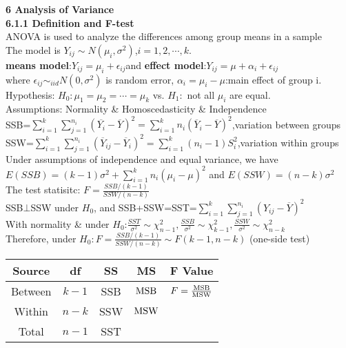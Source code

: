 \documentclass[10pt,a4paper,landscape]{article}
\begin{document}
\begin{multicols}{3}
{	
	
	
	
  {\small\textbf{6 Analysis of Variance}}\\
  \textbf{6.1.1 Definition and F-test}\\
  ANOVA is used to analyze the differences among group means in a sample\\
  The model is $Y_{ij}\sim N(\mu_i,\sigma^2 )$,$i=1,2,\cdots,k$.\\
  \textbf{means model}:$Y_{ij}=\mu_i+\epsilon_{ij}$and \textbf{effect model}:$Y_{ij}=\mu+\alpha_i+\epsilon_{ij}$ \\
  where $\epsilon_{ij}\sim_{iid}N(0,\sigma^2) $ is random error, $\alpha_i=\mu_i-\mu$:main effect of group i.
  Hypothesis: $H_0:\mu_1=\mu_2=\cdots = \mu_k$ vs. $H_1:$ not all $\mu_i$ are equal.\\
  Assumptions: Normality \& Homoscedasticity \& Independence \\
  SSB=$\sum_{i=1}^{k}\sum_{j=1}^{n_i}(\overline{Y_i}-\overline{Y} )^2=\sum_{i=1}^kn_i(\overline{Y}_i-\overline{Y} )^2 $,variation between groups \\
  SSW=$\sum_{i=1}^{k}\sum_{j=1}^{n_i}(\overline{Y}_{ij}-\overline{Y}_i )^2=\sum_{i=1}^k(n_i-1)S_i^2 $,variation within groups\\
  Under assumptions of independence and equal variance, we have $E(SSB)=(k-1)\sigma^2+\sum_{i=1}^k n_i(\mu_i-\mu)^2 $ and $E(SSW)=(n-k)\sigma^2$\\
  The test statisitc: $F=\frac{SSB/(k-1)}{SSW/(n-k)}$\\
  SSB$\bot$SSW under $H_0$, and SSB+SSW=SST=$\sum_{i=1}^k\sum_{j=1}^{n_i}(Y_{ij}-\overline{Y}) ^2$\\
  With normality \& under $H_0$:$\frac{SST}{\sigma^2}\sim \chi^2_{n-1} ,\frac{SSB}{\sigma^2}\sim \chi^2_{k-1} ,\frac{SSW}{\sigma^2}\sim \chi^2_{n-k} $\\
  Therefore, under $H_0:F=\frac{SSB/(k-1)}{SSW/(n-k)}\sim F(k-1,n-k)$ (one-side test)
  \begin{table}[H]
  	\scriptsize
  	\begin{tabular}{c|cccc}
  		\hline
  		Source & df           & SS   & MS           & F Value                           \\
  		\hline
  		Between     & $k-1$        & SSB  & ${\rm MSB}$  & $F=\frac{\rm MSB}{\rm MSW}$   \\
  		Within     & $n-k$        & SSW  & ${\rm MSW}$  &     \\
  		Total  & $n-1$        & SST  &              &             \\

\end{tabular}
\end{table}}
\end{multicols}
\end{document}
